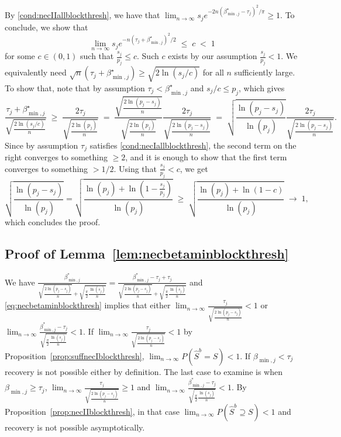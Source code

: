 \documentclass[aos]{imsart}
\theoremstyle{plain}
\begin{document}
By \eqref{cond:necIIallblockthresh}, we have that $\lim_{n\to\infty} {s_j} e^{-2n(\beta^\star_{\min,j}-\tau_j)^2/\pi}\geq 1$. To conclude, we show that
$$
\lim_{n\to\infty} {s_j} e^{-n(\tau_j+\beta^\star_{\min,j})^2/2}\;\leq\;c\;<\;1
$$ 
for some $c\in(0,1)$ such that $\tfrac{s_j}{p_j}\leq c$. Such $c$ exists by our assumption $\tfrac{s_j}{p_j}<1$.
We equivalently need
$\sqrt{n}(\tau_j+\beta^\star_{\min,j})\geq\sqrt{{2\ln (s_j/c)}}$ for all $n$ sufficiently large. To show that, note that by assumption $\tau_j< \beta^\star_{\min,j}$ and $s_j/c\leq p_j$, which gives
$$
\frac{\tau_j+\beta^\star_{\min,j}}{\sqrt{\tfrac{2\ln(s_j/c)}{n}}}\;\geq\;\frac{2\tau_j}{\sqrt{\tfrac{2\ln(p_j)}{n}}}\;=\;\frac{\sqrt{\tfrac{2\ln(p_j-s_j)}{n}}}{\sqrt{\tfrac{2\ln(p_j)}{n}}}\frac{2\tau_j}{\sqrt{\tfrac{2\ln(p_j-s_j)}{n}}}\;=\;\sqrt{\frac{\ln(p_j-s_j)}{\ln(p_j)}}\frac{2\tau_j}{\sqrt{\tfrac{2\ln(p_j-s_j)}{n}}}.
$$
Since by assumption $\tau_j$ satisfies \eqref{cond:necIallblockthresh}, the second term on the right converges to something $\geq 2$, and it is enough to show that the first term converges to something $>1/2$. Using that $\tfrac{s_j}{p_j}<c$, we get
$$
\sqrt{\frac{\ln(p_j-s_j)}{\ln(p_j)}}
= \sqrt{\frac{\ln(p_j) + \ln(1-\frac{s_j}{p_j})}{\ln(p_j)}}
\;\geq\;\sqrt{\frac{\ln(p_j)+\ln(1-c)}{\ln(p_j)}}\;\to\;1,
$$
which concludes the proof.

\subsection{Proof of Lemma~\ref{lem:necbetaminblockthresh}}
    We have $\frac{\beta_{\min,j}^*}{\sqrt{\tfrac{2\ln(p_j-s_j)}{n}}+\sqrt{\tfrac{\pi}{2}\tfrac{\ln(s_j)}{n}}}= \frac{\beta_{\min,j}^*-\tau_j+\tau_j}{\sqrt{\tfrac{2\ln(p_j-s_j)}{n}}+\sqrt{\tfrac{\pi}{2}\tfrac{\ln(s_j)}{n}}}$ and \eqref{eq:necbetaminblockthresh} implies that either $\lim_{n\to \infty}\frac{\tau_j}{\sqrt{\tfrac{2\ln(p_j-s_j)}{n}}} <1$ or $\lim_{n\to \infty}\frac{\beta_{\min,j}^*-\tau_j}{\sqrt{\tfrac{\pi}{2}\tfrac{\ln(s_j)}{n}}} <1$. 
    If $\lim_{n\to \infty}\frac{\tau_j}{\sqrt{\tfrac{2\ln(p_j-s_j)}{n}}} <1$ by Proposition~\ref{prop:suffnecIblockthresh}, $\lim_{n \to \infty} P(\hat{S}^{b} = S) < 1$. If $\beta_{\min,j}<\tau_j$ recovery is not possible either by definition.
    The last case to examine is when $\beta_{\min,j}\geq\tau_j$, $\lim_{n\to \infty}\frac{\tau_j}{\sqrt{\tfrac{2\ln(p_j-s_j)}{n}}} \geq 1$ and $\lim_{n\to \infty}\frac{\beta_{\min,j}^*-\tau_j}{\sqrt{\tfrac{\pi}{2}\tfrac{\ln(s_j)}{n}}} <1$. By Proposition~\ref{prop:necIIblockthresh}, in that case $\lim_{n \to \infty} P(\hat{S}^{b} \supseteq S ) < 1$ and recovery is not possible asymptotically.
\end{document}
